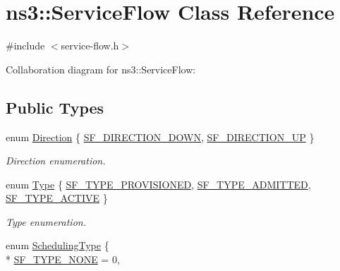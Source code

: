 \hypertarget{classns3_1_1ServiceFlow}{}\section{ns3\+:\+:Service\+Flow Class Reference}
\label{classns3_1_1ServiceFlow}


{\ttfamily \#include $<$service-\/flow.\+h$>$}



Collaboration diagram for ns3\+:\+:Service\+Flow\+:
\subsection*{Public Types}
\begin{DoxyCompactItemize}
\item 
enum \hyperlink{classns3_1_1ServiceFlow_ae14b8dc8bb371bad10fe078110655d4f}{Direction} \{ \hyperlink{classns3_1_1ServiceFlow_ae14b8dc8bb371bad10fe078110655d4fa14cabffe872245d876df31d3f63fc8b2}{S\+F\+\_\+\+D\+I\+R\+E\+C\+T\+I\+O\+N\+\_\+\+D\+O\+WN}, 
\hyperlink{classns3_1_1ServiceFlow_ae14b8dc8bb371bad10fe078110655d4fadbdc2e453d8d7a126f89ecedca018714}{S\+F\+\_\+\+D\+I\+R\+E\+C\+T\+I\+O\+N\+\_\+\+UP}
 \}\begin{DoxyCompactList}\small\item\em Direction enumeration. \end{DoxyCompactList}
\item 
enum \hyperlink{classns3_1_1ServiceFlow_a95a18bd8cae3a4eaa3568dad45ae941d}{Type} \{ \hyperlink{classns3_1_1ServiceFlow_a95a18bd8cae3a4eaa3568dad45ae941daf173379864cf3570db60adecc867fd66}{S\+F\+\_\+\+T\+Y\+P\+E\+\_\+\+P\+R\+O\+V\+I\+S\+I\+O\+N\+ED}, 
\hyperlink{classns3_1_1ServiceFlow_a95a18bd8cae3a4eaa3568dad45ae941da45207ce14ef69b52dbf86163cde22079}{S\+F\+\_\+\+T\+Y\+P\+E\+\_\+\+A\+D\+M\+I\+T\+T\+ED}, 
\hyperlink{classns3_1_1ServiceFlow_a95a18bd8cae3a4eaa3568dad45ae941da68cc7128fe19a5d911aace393cc12bd5}{S\+F\+\_\+\+T\+Y\+P\+E\+\_\+\+A\+C\+T\+I\+VE}
 \}\begin{DoxyCompactList}\small\item\em Type enumeration. \end{DoxyCompactList}
\item 
enum \hyperlink{classns3_1_1ServiceFlow_a7990ba10be1e098328fd1e6382a26235}{Scheduling\+Type} \{ \\*
\hyperlink{classns3_1_1ServiceFlow_a7990ba10be1e098328fd1e6382a26235a1c9639853c5529ae013feddcae94a4c6}{S\+F\+\_\+\+T\+Y\+P\+E\+\_\+\+N\+O\+NE} = 0, 

\end{DoxyCompactItemize}

